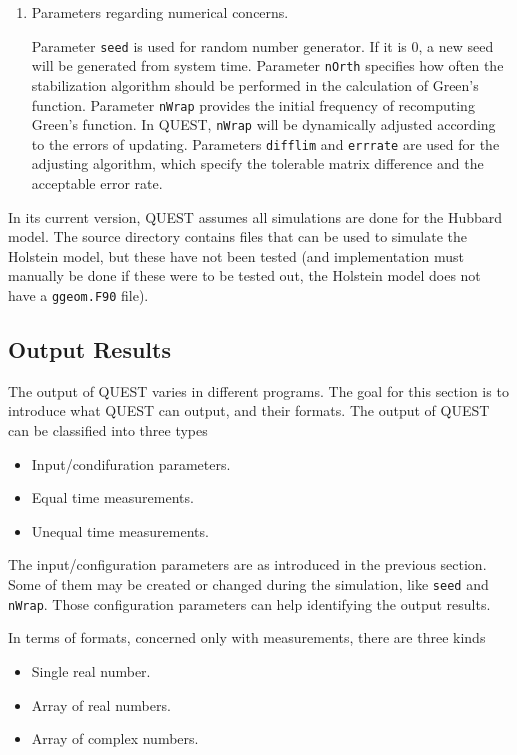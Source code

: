 \documentclass[12pt]{article}
\begin{document}
\begin{enumerate}
            \item Parameters regarding numerical concerns.

            Parameter \verb|seed| is used for random number generator.
            If it is 0, a new seed will be generated from system time.
            Parameter \verb|nOrth| specifies how often the stabilization algorithm
            should be performed in the calculation of Green's function.
            Parameter \verb|nWrap| provides the initial frequency of recomputing Green's function.
            In QUEST, \verb|nWrap| will be dynamically adjusted according to the errors
            of updating. Parameters \verb|difflim| and \verb|errrate| are used for the adjusting
            algorithm, which specify the tolerable matrix difference and the acceptable error rate.
        \end{enumerate}
        In its current version, QUEST assumes all simulations are done for the Hubbard model.
        The source directory contains files that can be used to simulate the Holstein model, but these have not been tested (and implementation must manually be done if these were to be tested out, the Holstein model does not have a \texttt{ggeom.F90} file).

\subsection{Output Results}\label{sec output}
The output of QUEST varies in different programs. The goal for this section is to introduce what QUEST can output, and their formats. The output of QUEST can be classified into three types
\begin{itemize}
 \item Input/condifuration parameters.
 \item Equal time measurements.
 \item Unequal time measurements.
\end{itemize}

The input/configuration parameters are as introduced in the previous section. Some of them may be created or changed during the simulation, like \verb"seed" and \verb"nWrap". Those configuration parameters can help identifying the output results.

In terms of formats, concerned only with measurements, there are three kinds
\begin{itemize}
 \item Single real number.
 \item Array of real numbers.
 \item Array of complex numbers.
\end{itemize}
\end{document}
